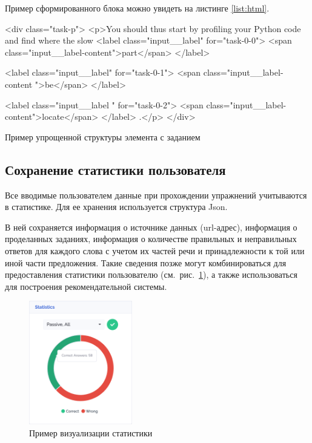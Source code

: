 Пример сформированного блока можно увидеть на листинге \ref{list:html}.

\begin{ListingEnv}[h]
\begin{Verb}
<div class="task-p">
<p>You should thus start by profiling your Python code and find
 where the slow
    <label class="input__label" for="task-0-0">
        <span class="input__label-content">part</span>
    </label>
    
    <label class="input__label" for="task-0-1">
        <span class="input__label-content ">be</span>
    </label>

    <label class="input__label " for="task-0-2">
        <span class="input__label-content">locate</span>
    </label>
.</p> 
</div>
\end{Verb}
\caption{Пример упрощенной структуры элемента с заданием}
\label{list:html}
\end{ListingEnv}
\subsection{Сохранение статистики пользователя}
Все вводимые пользователем данные при прохождении упражнений учитываются в статистике. Для ее хранения используется структура Json.  

В ней сохраняется информация о источнике данных (url-адрес), информация о проделанных заданиях, информация о количестве правильных и неправильных ответов для каждого слова с учетом их частей речи и принадлежности к той или иной части предложения. Такие сведения позже могут комбинироваться для предоставления статистики пользователю (см.~рис.~\ref{fig:stats-passive}), а также использоваться для построения рекомендательной системы.

\begin{figure}[ht]
\centering
\includegraphics[width=0.4\textwidth]{img/stats}
\caption{\label{fig:stats-passive}Пример визуализации статистики}
\end{figure}

